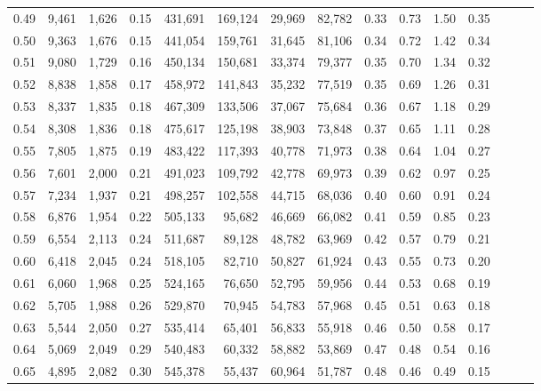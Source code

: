\begin{tabular}{rrrrrrrrrrrrrrr}
0.49 &   9,461 &  1,626 &  0.15 &  431,691 &  169,124 &   29,969 &   82,782 &  0.33 &  0.73 &  1.50 &      0.35 \\
0.50 &   9,363 &  1,676 &  0.15 &  441,054 &  159,761 &   31,645 &   81,106 &  0.34 &  0.72 &  1.42 &      0.34 \\
0.51 &   9,080 &  1,729 &  0.16 &  450,134 &  150,681 &   33,374 &   79,377 &  0.35 &  0.70 &  1.34 &      0.32 \\
0.52 &   8,838 &  1,858 &  0.17 &  458,972 &  141,843 &   35,232 &   77,519 &  0.35 &  0.69 &  1.26 &      0.31 \\
0.53 &   8,337 &  1,835 &  0.18 &  467,309 &  133,506 &   37,067 &   75,684 &  0.36 &  0.67 &  1.18 &      0.29 \\
0.54 &   8,308 &  1,836 &  0.18 &  475,617 &  125,198 &   38,903 &   73,848 &  0.37 &  0.65 &  1.11 &      0.28 \\
0.55 &   7,805 &  1,875 &  0.19 &  483,422 &  117,393 &   40,778 &   71,973 &  0.38 &  0.64 &  1.04 &      0.27 \\
0.56 &   7,601 &  2,000 &  0.21 &  491,023 &  109,792 &   42,778 &   69,973 &  0.39 &  0.62 &  0.97 &      0.25 \\
0.57 &   7,234 &  1,937 &  0.21 &  498,257 &  102,558 &   44,715 &   68,036 &  0.40 &  0.60 &  0.91 &      0.24 \\
0.58 &   6,876 &  1,954 &  0.22 &  505,133 &   95,682 &   46,669 &   66,082 &  0.41 &  0.59 &  0.85 &      0.23 \\
0.59 &   6,554 &  2,113 &  0.24 &  511,687 &   89,128 &   48,782 &   63,969 &  0.42 &  0.57 &  0.79 &      0.21 \\
0.60 &   6,418 &  2,045 &  0.24 &  518,105 &   82,710 &   50,827 &   61,924 &  0.43 &  0.55 &  0.73 &      0.20 \\
0.61 &   6,060 &  1,968 &  0.25 &  524,165 &   76,650 &   52,795 &   59,956 &  0.44 &  0.53 &  0.68 &      0.19 \\
0.62 &   5,705 &  1,988 &  0.26 &  529,870 &   70,945 &   54,783 &   57,968 &  0.45 &  0.51 &  0.63 &      0.18 \\
0.63 &   5,544 &  2,050 &  0.27 &  535,414 &   65,401 &   56,833 &   55,918 &  0.46 &  0.50 &  0.58 &      0.17 \\
0.64 &   5,069 &  2,049 &  0.29 &  540,483 &   60,332 &   58,882 &   53,869 &  0.47 &  0.48 &  0.54 &      0.16 \\
0.65 &   4,895 &  2,082 &  0.30 &  545,378 &   55,437 &   60,964 &   51,787 &  0.48 &  0.46 &  0.49 &      0.15 \\

\end{tabular}
